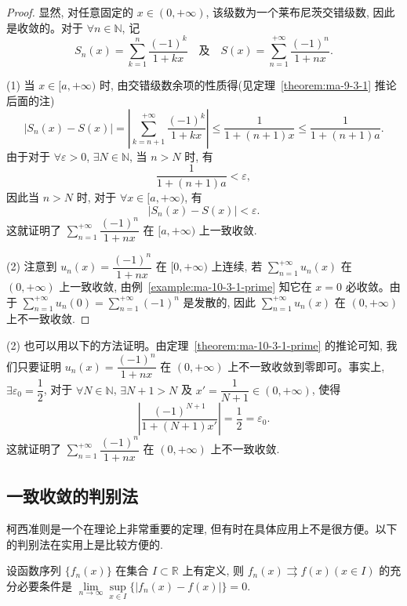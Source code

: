 \begin{proof}
显然, 对任意固定的 $x\in(0,+\infty)$, 该级数为一个莱布尼茨交错级数, 因此是收敛的。对于 $\forall n\in\mathbb N$, 记
\[
  S_n(x)=\sum_{k=1}^n\frac{(-1)^k}{1+kx}\quad\text{及}\quad S(x)=\sum_{n=1}^{+\infty}\frac{(-1)^n}{1+nx}.
\]

(1) 当 $x\in[a,+\infty)$ 时, 由交错级数余项的性质得(见定理~\ref{theorem:ma-9-3-1} 推论后面的注)
\[
  |S_n(x)-S(x)|=\left|\sum_{k=n+1}^{+\infty}\frac{(-1)^k}{1+kx}\right|\leq\frac1{1+(n+1)x}\leq\frac1{1+(n+1)a}.
\]
由于对于 $\forall\varepsilon>0$, $\exists N\in\mathbb N$, 当 $n>N$ 时, 有
\[
  \frac1{1+(n+1)a}<\varepsilon,
\]
因此当 $n>N$ 时, 对于 $\forall x\in[a,+\infty)$, 有
\[
  |S_n(x)-S(x)|<\varepsilon.
\]
这就证明了 $\sum\limits_{n=1}^{+\infty}\dfrac{(-1)^n}{1+nx}$ 在 $[a,+\infty)$ 上一致收敛.

(2) 注意到 $u_n(x)=\dfrac{(-1)^n}{1+nx}$ 在 $[0,+\infty)$ 上连续, 若 $\sum\limits_{n=1}^{+\infty}u_n(x)$ 在 $(0,+\infty)$ 上一致收敛, 由例~\ref{example:ma-10-3-1-prime} 知它在 $x=0$ 必收敛。由于 $\sum\limits_{n=1}^{+\infty}u_n(0)=\sum\limits_{n=1}^{+\infty}(-1)^n$ 是发散的, 因此 $\sum\limits_{n=1}^{+\infty}u_n(x)$ 在 $(0,+\infty)$ 上不一致收敛.
\end{proof}


\begin{remark}\label{remark:ma-10-source-23}
(2) 也可以用以下的方法证明。由定理~\ref{theorem:ma-10-3-1-prime} 的推论可知, 我们只要证明 $u_n(x)=\dfrac{(-1)^n}{1+nx}$ 在 $(0,+\infty)$ 上不一致收敛到零即可。事实上, $\exists\varepsilon_0=\dfrac12$, 对于 $\forall N\in\mathbb N$, $\exists N+1>N$ 及 $x'=\dfrac1{N+1}\in(0,+\infty)$, 使得
\[
  \left|\frac{(-1)^{N+1}}{1+(N+1)x'}\right|=\frac12=\varepsilon_0.
\]
这就证明了 $\sum\limits_{n=1}^{+\infty}\dfrac{(-1)^n}{1+nx}$ 在 $(0,+\infty)$ 上不一致收敛.
\end{remark}


\subsection{一致收敛的判别法}
\label{subsec:ma-10-3-2}

柯西准则是一个在理论上非常重要的定理, 但有时在具体应用上不是很方便。以下的判别法在实用上是比较方便的.

\begin{theorem}\label{theorem:ma-10-3-2}
设函数序列 $\{f_n(x)\}$ 在集合 $I\subset\mathbb R$ 上有定义, 则 $f_n(x)\rightrightarrows f(x)(x\in I)$ 的充分必要条件是 $\lim\limits_{n\to\infty}\sup\limits_{x\in I}\{|f_n(x)-f(x)|\}=0$.
\end{theorem}


